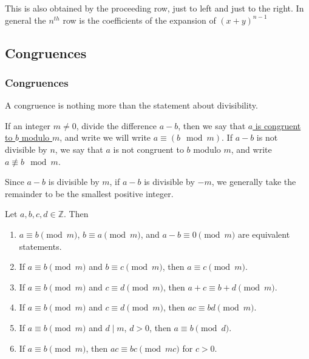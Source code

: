 \documentclass[11pt]{article}
\begin{document}
This is also obtained by the proceeding row, just to left and just to the
right. In general the \(n^{th}\) row is the coefficients of the expansion of
\((x + y)^{n - 1}\)

\subsection{Congruences}
\subsubsection{Congruences}
A congruence is nothing more than the statement about divisibility.
\begin{definition}
    If an integer \(m \neq 0\), divide the difference \(a - b\), then we say that \underline{\(a\) is congruent to \(b\) modulo \(m\)}, and write we will write \(a \equiv (b \mod{m})\). If \(a - b\) is not divisible by \(n\), we say that \(a\) is not congruent to \(b\) modulo \(m\), and write \(a \not\equiv b \mod{m}\).
\end{definition}

\begin{fact}
    Since \(a - b\) is divisible by \(m\), if \(a - b\) is divisible by \(-m\), we generally take the remainder to be the smallest positive integer.
\end{fact}

\begin{theorem}\label{2.1}
    Let \(a, b, c, d \in \mathbb{Z}\). Then
    \begin{enumerate}
        \item \(a \equiv b \pmod{m}\), \(b \equiv a \pmod{m}\), and \(a - b \equiv 0 \pmod{m}\) are equivalent statements.
        \item If \(a \equiv b \pmod{m}\) and \(b \equiv c \pmod{m}\), then \(a \equiv c
              \pmod{m}\).
        \item If \(a \equiv b \pmod{m}\) and \(c \equiv d \pmod{m}\), then \(a + c \equiv b +
              d \pmod{m}\).
        \item If \(a \equiv b \pmod{m}\) and \(c \equiv d \pmod{m}\), then \(ac \equiv bd
              \pmod{m}\).
        \item If \(a \equiv b \pmod{m}\) and \(d \mid m\), \(d > 0\), then \(a \equiv b
              \pmod{d}\).
        \item If \(a \equiv b \pmod{m}\), then \(ac \equiv bc \pmod{mc}\) for \(c > 0\).
    \end{enumerate}
\end{theorem}
\end{document}

